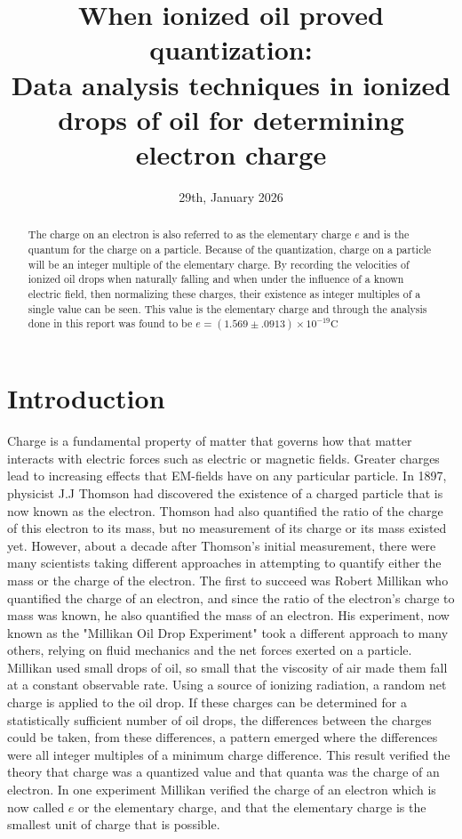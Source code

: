 \documentclass[%
 reprint,
 amsmath,amssymb,
 aps,
]{revtex4-2}
\begin{document}
\title{When ionized oil proved quantization:\\ Data analysis techniques in ionized drops of oil for determining electron charge  }

\date{29th, January 2026}

\begin{abstract}
The charge on an electron is also referred to as the elementary charge $e$ and is the quantum for the charge on a particle. Because of the quantization, charge on a particle will be an integer multiple of the elementary charge. By recording the velocities of ionized oil drops when naturally falling and when under the influence of a known electric field, then normalizing these charges, their existence as integer multiples of a single value can be seen. This value is the elementary charge and through the analysis done in this report was found to be $e = (1.569 \pm .0913) \times 10^{-19} \text{C}$
\end{abstract}

\maketitle

\section{Introduction}
Charge is a fundamental property of matter that governs how that matter interacts with electric forces such as electric or magnetic fields. Greater charges lead to increasing effects that EM-fields have on any particular particle. In 1897, physicist J.J Thomson had discovered the existence of a charged particle that is now known as the electron\cite{thomson}. Thomson had also quantified the ratio of the charge of this electron to its mass, but no measurement of its charge or its mass existed yet. However, about a decade after Thomson's initial measurement, there were many scientists taking different approaches in attempting to quantify either the mass or the charge of the electron. The first to succeed was Robert Millikan who quantified the charge of an electron, and since the ratio of the electron's charge to mass was known, he also quantified the mass of an electron. His experiment, now known as the "Millikan Oil Drop Experiment" took a different approach to many others, relying on fluid mechanics and the net forces exerted on a particle. Millikan used small drops of oil, so small that the viscosity of air made them fall at a constant observable rate. Using a source of ionizing radiation, a random net charge is applied to the oil drop. If these charges can be determined for a statistically sufficient number of oil drops, the differences between the charges could be taken, from these differences, a pattern emerged where the differences were all integer multiples of a minimum charge difference. This result verified the theory that charge was a quantized value and that quanta was the charge of an electron. In one experiment Millikan verified the charge of an electron which is now called $e$ or the elementary charge, and that the elementary charge is the smallest unit of charge that is possible. 
\end{document}
